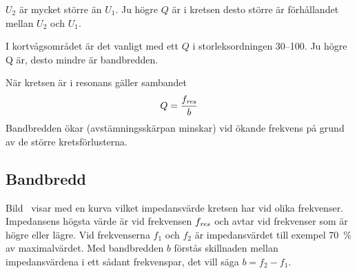 \(U_2\) är mycket större än \(U_1\).
Ju högre \(Q\) är i kretsen desto större är förhållandet mellan \(U_2\) och
\(U_1\).

I kortvågsområdet är det vanligt med ett \(Q\) i storleksordningen 30--100.
Ju högre Q är, desto mindre är bandbredden.

När kretsen är i resonans gäller sambandet
%
\[Q = \frac{f_{\it res}}{b}\]
%
Bandbredden ökar (avstämningsskärpan minskar) vid ökande frekvens på grund av de
större kretsförlusterna.


\subsection{Bandbredd}

Bild~ visar med en kurva vilket impedansvärde kretsen har
vid olika frekvenser.
Impedansens högsta värde är vid frekvensen \(f_{\it res}\) och avtar vid
frekvenser som är högre eller lägre.
Vid frekvenserna \(f_1\) och \(f_2\) är impedansvärdet till exempel 70~\% av
maximalvärdet.
Med bandbredden \(b\) förstås skillnaden mellan impedansvärdena i ett sådant
frekvenspar, det vill säga \(b = f_2 - f_1\).
